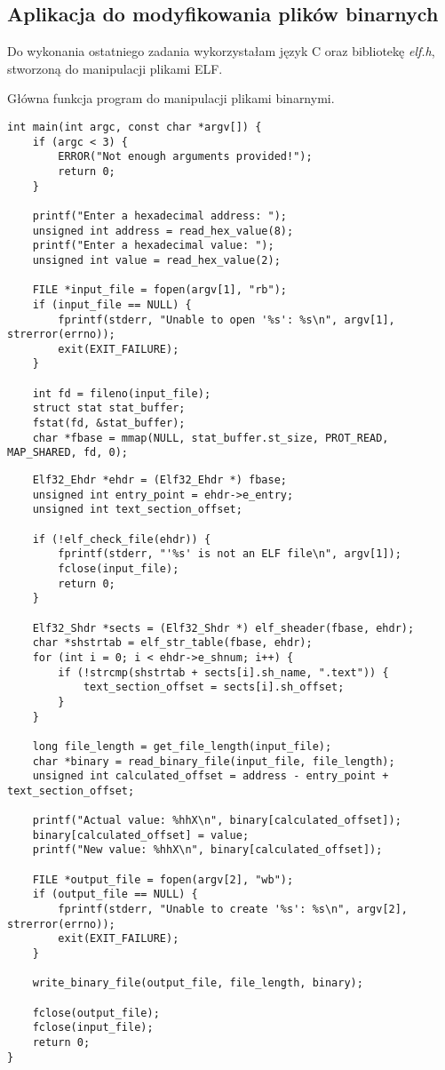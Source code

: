 \documentclass[12pt,a4paper,titlepage]{article}
\begin{document}
\subsection{Aplikacja do modyfikowania plików binarnych}
Do wykonania ostatniego zadania wykorzystałam język C oraz bibliotekę \textit{elf.h}, stworzoną do manipulacji plikami ELF.

\begin{listing}[H]
\caption{Główna funkcja program do manipulacji plikami binarnymi.}
\begin{verbatim}
int main(int argc, const char *argv[]) {
    if (argc < 3) {
        ERROR("Not enough arguments provided!");
        return 0;
    }

    printf("Enter a hexadecimal address: ");
    unsigned int address = read_hex_value(8);
    printf("Enter a hexadecimal value: ");
    unsigned int value = read_hex_value(2);

    FILE *input_file = fopen(argv[1], "rb");
    if (input_file == NULL) {
        fprintf(stderr, "Unable to open '%s': %s\n", argv[1], strerror(errno));
        exit(EXIT_FAILURE);
    }

    int fd = fileno(input_file);
    struct stat stat_buffer;
    fstat(fd, &stat_buffer);
    char *fbase = mmap(NULL, stat_buffer.st_size, PROT_READ, MAP_SHARED, fd, 0);
\end{verbatim}
\end{listing}
\begin{listing}[H]
\begin{verbatim}
    Elf32_Ehdr *ehdr = (Elf32_Ehdr *) fbase;
    unsigned int entry_point = ehdr->e_entry;
    unsigned int text_section_offset;

    if (!elf_check_file(ehdr)) {
        fprintf(stderr, "'%s' is not an ELF file\n", argv[1]);
        fclose(input_file);
        return 0;
    }

    Elf32_Shdr *sects = (Elf32_Shdr *) elf_sheader(fbase, ehdr);
    char *shstrtab = elf_str_table(fbase, ehdr);
    for (int i = 0; i < ehdr->e_shnum; i++) {
        if (!strcmp(shstrtab + sects[i].sh_name, ".text")) {
            text_section_offset = sects[i].sh_offset;
        }
    }

    long file_length = get_file_length(input_file);
    char *binary = read_binary_file(input_file, file_length);
    unsigned int calculated_offset = address - entry_point + text_section_offset;

    printf("Actual value: %hhX\n", binary[calculated_offset]);
    binary[calculated_offset] = value;
    printf("New value: %hhX\n", binary[calculated_offset]);

    FILE *output_file = fopen(argv[2], "wb");
    if (output_file == NULL) {
        fprintf(stderr, "Unable to create '%s': %s\n", argv[2], strerror(errno));
        exit(EXIT_FAILURE);
    }

    write_binary_file(output_file, file_length, binary);

    fclose(output_file);
    fclose(input_file);
    return 0;
}
\end{verbatim}
\end{listing}
\end{document}
